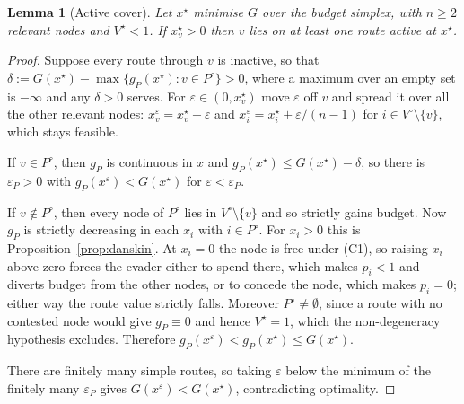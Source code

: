 \documentclass[10pt,a4paper,twoside]{article}
\theoremstyle{plain}
\newtheorem{lemma}[theorem]{Lemma}
\theoremstyle{definition}
\begin{document}
\begin{lemma}[Active cover]
\label{lem:active-cover}
Let $x^{\star}$ minimise $G$ over the budget simplex, with $n\ge2$ relevant
nodes and $V^{\star}<1$. If $x^{\star}_v>0$ then $v$ lies on at least one
route active at $x^{\star}$.
\end{lemma}
\begin{proof}
Suppose every route through $v$ is inactive, so that
$\delta:=G(x^{\star})-\max\{g_P(x^{\star}):v\in P^{\circ}\}>0$, where a
maximum over an empty set is $-\infty$ and any $\delta>0$ serves. For
$\varepsilon\in(0,x^{\star}_v)$ move $\varepsilon$ off $v$ and spread it over
all the other relevant nodes:
$x^{\varepsilon}_v=x^{\star}_v-\varepsilon$ and
$x^{\varepsilon}_i=x^{\star}_i+\varepsilon/(n-1)$ for $i\in
V^{\circ}\setminus\{v\}$, which stays feasible.

If $v\in P^{\circ}$, then $g_P$ is continuous in $x$ and
$g_P(x^{\star})\le G(x^{\star})-\delta$, so there is $\varepsilon_P>0$ with
$g_P(x^{\varepsilon})<G(x^{\star})$ for $\varepsilon<\varepsilon_P$.

If $v\notin P^{\circ}$, then every node of $P^{\circ}$ lies in
$V^{\circ}\setminus\{v\}$ and so strictly gains budget. Now $g_P$ is strictly
decreasing in each $x_i$ with $i\in P^{\circ}$. For $x_i>0$ this is
Proposition~\ref{prop:danskin}. At $x_i=0$ the node is free under (C1), so
raising $x_i$ above zero forces the evader either to spend there, which makes
$p_i<1$ and diverts budget from the other nodes, or to concede the node,
which makes $p_i=0$; either way the route value strictly falls.
Moreover $P^{\circ}\ne\emptyset$, since a route with no contested node would
give $g_P\equiv0$ and hence $V^{\star}=1$, which the non-degeneracy
hypothesis excludes. Therefore $g_P(x^{\varepsilon})<g_P(x^{\star})\le
G(x^{\star})$.

There are finitely many simple routes, so taking $\varepsilon$ below the
minimum of the finitely many $\varepsilon_P$ gives
$G(x^{\varepsilon})<G(x^{\star})$, contradicting optimality.
\end{proof}
\end{document}
